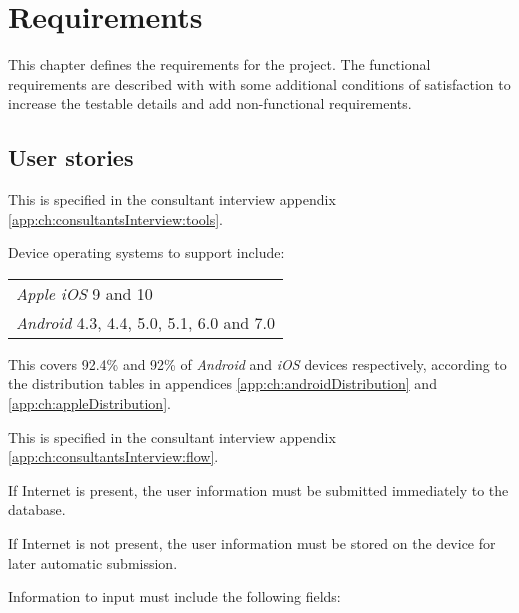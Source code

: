 \chapter{Requirements}\label{ch:Requirements}
This chapter defines the requirements for the project.
The functional requirements are described with  with some additional conditions of satisfaction to increase the testable details and add non-functional requirements.

\section*{User stories}


This  is specified in the consultant interview appendix \ref{app:ch:consultantsInterview:tools}.

Device operating systems to support include: \newline
\begin{tabularx}{\textwidth}{X}
    \textit{Apple iOS} 9 and 10 \\
    \textit{Android} 4.3, 4.4, 5.0, 5.1, 6.0 and 7.0
\end{tabularx}

This covers 92.4\% and 92\% of \textit{Android} and \textit{iOS} devices respectively, according to the distribution tables in appendices \ref{app:ch:androidDistribution} and \ref{app:ch:appleDistribution}.


This  is specified in the consultant interview appendix \ref{app:ch:consultantsInterview:flow}.

If Internet is present, the user information must be submitted immediately to the database.

If Internet is not present, the user information must be stored on the device for later automatic submission.

Information to input must include the following fields:\newline
{}

